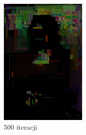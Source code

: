 \begin{figure}[!htb]
\begin{subfigure}[b]{0.3\textwidth}
         \includegraphics[width=\textwidth]{images/mona/10000_300_2/img_0_it_500_best.png}
         \caption{500 iteracji}
    \end{subfigure}
    \begin{subfigure}[b]{0.3\textwidth}
        \centering

\end{subfigure}
\end{figure}
